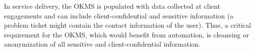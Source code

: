
In service delivery, the OKMS is populated with data collected at client
engagements and can include client-confidential and sensitive information (\eg a
problem ticket might contain the contact information of the user). Thus, a
critical requirement for the OKMS, which would benefit from automation, is
cleansing or anonymization of all sensitive and client-confidential information.


